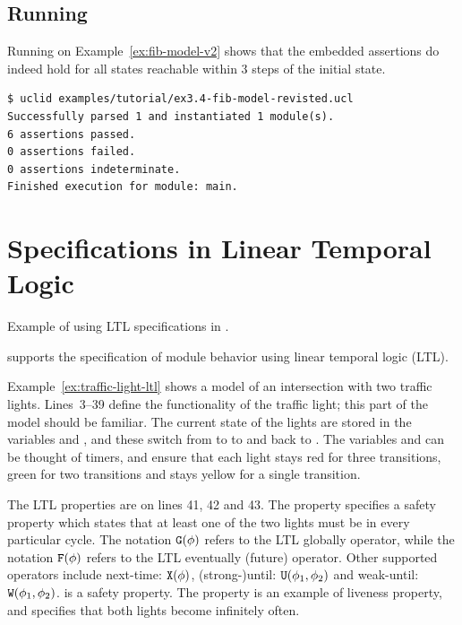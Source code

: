 \subsection{Running \uclid{}}

Running \uclid{} on Example~\ref{ex:fib-model-v2} shows that the embedded assertions do indeed hold for all states reachable within 3 steps of the initial state.

\begin{Verbatim}[frame=single, samepage=true]
$ uclid examples/tutorial/ex3.4-fib-model-revisted.ucl 
Successfully parsed 1 and instantiated 1 module(s).
6 assertions passed.
0 assertions failed.
0 assertions indeterminate.
Finished execution for module: main.
\end{Verbatim}

\section{Specifications in Linear Temporal Logic}
\begin{uclidlisting}[htbp]
    
    \caption{Example of using LTL specifications in \uclid{}.}
    \label{ex:traffic-light-ltl}
\end{uclidlisting}

\uclid{} supports the specification of module behavior using linear temporal logic (LTL). 

Example~\ref{ex:traffic-light-ltl} shows a \uclid{} model of an intersection with two traffic lights. Lines~3--39 define the functionality of the traffic light; this part of the model should be familiar. The current state of the lights are stored in the variables  and , and these switch from  to  to  and back to . The variables  and  can be thought of timers, and ensure that each light stays red for three transitions, green for two transitions and stays yellow for a single transition. 

The LTL properties are on lines 41, 42 and 43. The property  specifies a safety property which states that at least one of the two lights must be  in every particular cycle. The notation $\texttt{G}(\phi)$ refers to the LTL globally operator, while the notation $\texttt{F}(\phi)$ refers to the LTL eventually (future) operator. Other supported operators include next-time: $\texttt{X}(\phi)$, (strong-)until: $\texttt{U}(\phi_1, \phi_2)$ and weak-until: $\texttt{W}(\phi_1, \phi_2)$.  is a safety property. The property  is an example of liveness property, and specifies that both lights become  infinitely often.

